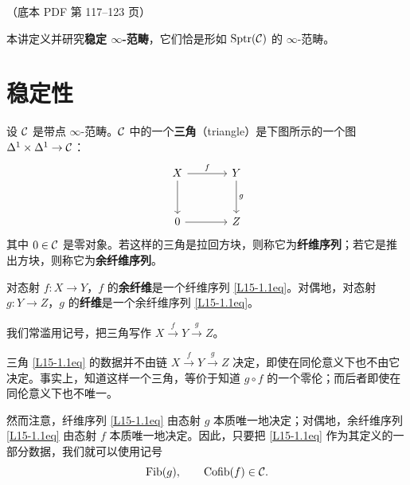 \begin{center}\small\color{black!55}（底本 PDF 第 117–123 页）\end{center}

本讲定义并研究\textbf{稳定 $\infty$-范畴}，它们恰是形如 $\mathrm{Sptr}(\mathcal{C})$ 的 $\infty$-范畴。

\section{稳定性}

\begin{definition}\label{L15-1.1}
设 $\mathcal{C}$ 是带点 $\infty$-范畴。$\mathcal{C}$ 中的一个\textbf{三角}（triangle）是下图所示的一个图 $\Delta^{1}\times\Delta^{1}\to\mathcal{C}$：
\begin{equation}\label{L15-1.1eq}
\begin{tikzcd}[column sep=3.6em,row sep=3em]
X \arrow[r,"f"] \arrow[d] & Y \arrow[d,"g"] \\
0 \arrow[r] & Z
\end{tikzcd}
\end{equation}
其中 $0\in\mathcal{C}$ 是零对象。若这样的三角是拉回方块，则称它为\textbf{纤维序列}；若它是推出方块，则称它为\textbf{余纤维序列}。

对态射 $f:X\to Y$，$f$ 的\textbf{余纤维}是一个纤维序列 \eqref{L15-1.1eq}。对偶地，对态射 $g:Y\to Z$，$g$ 的\textbf{纤维}是一个余纤维序列 \eqref{L15-1.1eq}。
\end{definition}


\nitem\label{L15-1.2} 我们常滥用记号，把三角写作 $X\xrightarrow{f}Y\xrightarrow{g}Z$。

\begin{warning}\label{L15-1.3}
三角 \eqref{L15-1.1eq} 的数据并不由链 $X\xrightarrow{f}Y\xrightarrow{g}Z$ 决定，即使在同伦意义下也不由它决定。事实上，知道这样一个三角，等价于知道 $g\circ f$ 的一个零伦；而后者即使在同伦意义下也不唯一。
\end{warning}

\nitem\label{L15-1.4} 然而注意，纤维序列 \eqref{L15-1.1eq} 由态射 $g$ 本质唯一地决定；对偶地，余纤维序列 \eqref{L15-1.1eq} 由态射 $f$ 本质唯一地决定。因此，只要把 \eqref{L15-1.1eq} 作为其定义的一部分数据，我们就可以使用记号
\[
\operatorname{Fib}(g),\qquad \operatorname{Cofib}(f)\in\mathcal{C} .
\]

